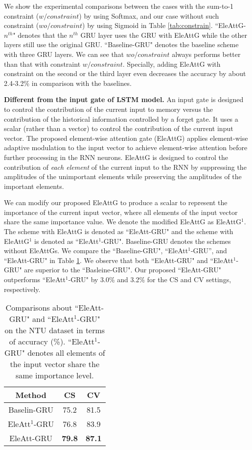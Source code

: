 \documentclass[journal]{IEEEtran}
\begin{document}
We show the experimental comparisons between the cases with the sum-to-1 constraint ($w/ constraint$) by using Softmax, and our case without such constraint ($wo/ constraint$) by using Sigmoid in Table \ref{tab:constrain}. ``EleAttG-$n^{th}$" denotes that the $n^{th}$ GRU layer uses the GRU with EleAttG while the other layers still use the original GRU. ``Baseline-GRU" denotes the baseline scheme with three GRU layers. We can see that $wo/ constraint$ always performs better than that with constraint $w/ constraint$. Specially, adding EleAttG with constraint on the second or the third layer even decreases the accuracy by about 2.4-3.2\% in comparison with the baselines. 

\textbf{Different from the input gate of LSTM model.}  An input gate is designed to control the contribution of the current input to memory versus the contribution of the historical information controlled by a forget gate. It uses a scalar (rather than a vector) to control the contribution of the current input vector. The proposed element-wise attention gate (EleAttG) applies element-wise adaptive modulation to the input vector to achieve element-wise attention before further processing in the RNN neurons. EleAttG is designed to control the contribution of {\emph{each element}} of the current input to the RNN by suppressing the amplitudes of the unimportant elements while preserving the amplitudes of the important elements.


We can modify our proposed EleAttG to produce a scalar to represent the importance of the current input vector, where all elements of the input vector share the same importance value. We denote the modified EleAttG as EleAttG$^1$. The scheme with EleAttG is denoted as ``EleAtt-GRU" and the scheme with EleAttG$^1$ is denoted as ``EleAtt$^1$-GRU". Baseline-GRU denotes the schemes without EleAttGs. We compare the ``Baseline-GRU", ``EleAtt$^1$-GRU'', and  ``EleAtt-GRU" in Table \ref{tab:gate}. We observe that both ``EleAtt-GRU" and ``EleAtt$^1$-GRU" are superior to the ``Basleine-GRU". Our proposed ``EleAtt-GRU" outperforms ``EleAtt$^1$-GRU" by 3.0\% and 3.2\% for the CS and CV settings, respectively.


\setlength{\tabcolsep}{6pt}
\begin{table}[!]
  \centering
  \caption{Comparisons about ``EleAtt-GRU" and ``EleAtt$^1$-GRU" on the NTU dataset in terms of accuracy (\%).  ``EleAtt$^1$-GRU" denotes all elements of the input vector share the same importance level.}
    \begin{tabular}{ccc}
    \toprule
    Method & CS  & CV \\
    \midrule
    Baselin-GRU & 75.2 & 81.5 \\
    EleAtt$^1$-GRU & 76.8 & 83.9 \\
    EleAtt-GRU & \textbf{79.8} & \textbf{87.1} \\
    \bottomrule
    \end{tabular}
  \label{tab:gate}
\end{table}
\end{document}
